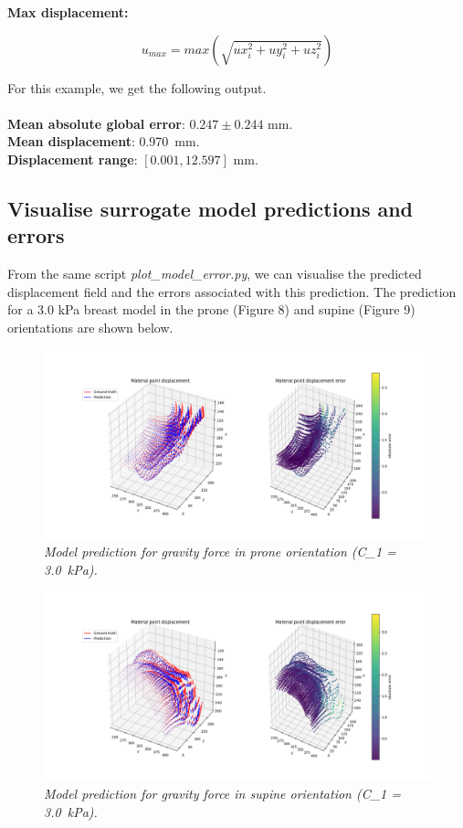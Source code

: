 \documentclass[11pt]{article}
\begin{document}
\textbf{Max displacement: }
\begin{itemize}
    \begin{equation}
        u_{max} = max(\sqrt{ux_{i}^2 + uy_{i}^2 + uz_{i}^2})    
    \end{equation}
\end{itemize}

For this example, we get the following output. \\
\\
\textbf{Mean absolute global error}: $0.247 \pm 0.244$ mm. \\
\textbf{Mean displacement}: \SI{0.970}{mm}. \\
\textbf{Displacement range}: $[0.001, 12.597]$ mm. 

\subsection{Visualise surrogate model predictions and errors}
From the same script \textit{plot\_model\_error.py}, we can visualise the predicted displacement field and the errors associated with this prediction. The prediction for a 3.0 kPa breast model in the prone (Figure 8) and supine (Figure 9) orientations are shown below. 

\begin{figure}
\centering
\includegraphics[scale=1.0]{Images/breast/surrogate_model/3.0_prone_model.png}
\caption{\textit{\label{fig8}Model prediction for gravity force in prone orientation (C_1 = \SI{3.0}{kPa}).}}
\end{figure}

\begin{figure}
\centering
\includegraphics[scale=1.0]{Images/breast/surrogate_model/3.0_supine_model.png}
\caption{\textit{\label{fig9}Model prediction for gravity force in supine orientation (C_1 = \SI{3.0}{kPa}).}}
\end{figure}
\end{document}
